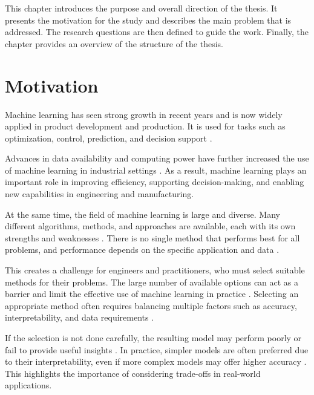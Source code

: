 \label{ch:introduction}

This chapter introduces the purpose and overall direction 
of the thesis. It presents the motivation for the study 
and describes the main problem that is addressed. 
The research questions are then defined to guide the work. 
Finally, the chapter provides an overview 
of the structure of the thesis.

\section{Motivation}

\label{introduction:motivation}

Machine learning has seen strong growth in recent years 
and is now widely applied in product development 
and production. It is used for tasks such as optimization, 
control, prediction, and decision support 
\parencite{wuest2016ml_manufacturing}. 

Advances in data availability and computing power 
have further increased the use of machine learning 
in industrial settings \parencite{rai2021ml_manufacturing_industry4}. 
As a result, machine learning plays an important role 
in improving efficiency, supporting decision-making, 
and enabling new capabilities in engineering and manufacturing.

At the same time, the field of machine learning 
is large and diverse. Many different algorithms, 
methods, and approaches are available, 
each with its own strengths and weaknesses 
\parencite{wuest2016ml_manufacturing}. 
There is no single method that performs best 
for all problems, and performance depends on 
the specific application and data 
\parencite{adekoya2022applications_ai_em,lee2020machine_learning_enterprises}. 

This creates a challenge for engineers and practitioners, 
who must select suitable methods for their problems. 
The large number of available options can act as a barrier 
and limit the effective use of machine learning in practice 
\parencite{adekoya2022applications_ai_em}. 
Selecting an appropriate method often requires balancing 
multiple factors such as accuracy, interpretability, 
and data requirements 
\parencite{plathottam2023review_ai_manufacturing,ali2017accurate_multi_criteria_decision_making_methodology_recommending_machine_learning_algorithm}. 

If the selection is not done carefully, the resulting model 
may perform poorly or fail to provide useful insights 
\parencite{ali2017accurate_multi_criteria_decision_making_methodology_recommending_machine_learning_algorithm}. 
In practice, simpler models are often preferred 
due to their interpretability, even if more complex models 
may offer higher accuracy \parencite{paleyes2022challenges_deploying_ml_survey_case_studies}. 
This highlights the importance of considering trade-offs 
in real-world applications.

